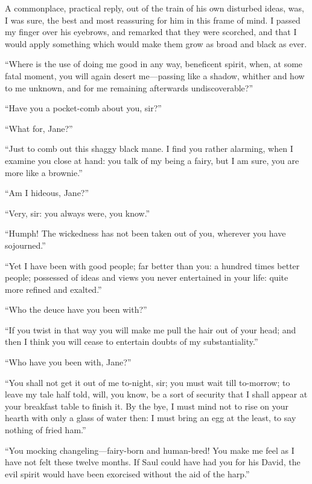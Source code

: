 A commonplace, practical reply, out of the train of his own disturbed
ideas, was, I was sure, the best and most reassuring for him in this
frame of mind. I passed my finger over his eyebrows, and remarked that
they were scorched, and that I would apply something which would make
them grow as broad and black as ever.

\enquote{Where is the use of doing me good in any way, beneficent spirit, when,
at some fatal moment, you will again desert me---passing like a shadow,
whither and how to me unknown, and for me remaining afterwards
undiscoverable?} %

\enquote{Have you a pocket-comb about you, sir?}

\enquote{What for, Jane?}

\enquote{Just to comb out this shaggy black mane. I find you rather
alarming, when I examine you close at hand: you talk of my being a
fairy, but I am sure, you are more like a brownie.}

\enquote{Am I hideous, Jane?}

\enquote{Very, sir: you always were, you know.}

\enquote{Humph! The wickedness has not been taken out of you, wherever
you have sojourned.}

\enquote{Yet I have been with good people; far better than you: a
hundred times better people; possessed of ideas and views you never
entertained in your life: quite more refined and exalted.}

\enquote{Who the deuce have you been with?}

\enquote{If you twist in that way you will make me pull the hair out of
your head; and then I think you will cease to entertain doubts of my
substantiality.}

\enquote{Who have you been with, Jane?}

\enquote{You shall not get it out of me to-night, sir; you must wait
till to-morrow; to leave my tale half told, will, you know, be a sort of
security that I shall appear at your breakfast table to finish it. By
the bye, I must mind not to rise on your hearth with only a glass of
water then: I must bring an egg at the least, to say nothing of fried
ham.}

\enquote{You mocking changeling---fairy-born and human-bred! You make
me feel as I have not felt these twelve months. If Saul could have had
you for his David, the evil spirit would have been exorcised without the
aid of the harp.}

